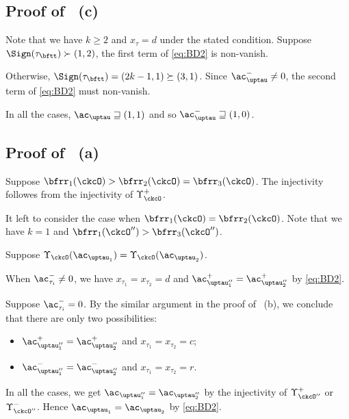\documentclass[12pt,a4paper]{amsart}
\def\pac#1{\ac_{#1}^+}
\def\nac#1{\ac_{#1}^-}
\numberwithin{equation}{section}
\theoremstyle{remark}
\def\PBPes{\mathrm{PBP}^{\mathrm{ext}}_{\star}}
\begin{document}
  \subsection*{\bf Proof of ~(c)}

  Note that we have $k\geq 2$ and $x_{\tau}=d$ under the stated condition.
  Suppose $\Sign( {\tau}_{\bftt} )\succ (1,2)$, the
  first term of \eqref{eq:BD2} is non-vanish.

  Otherwise, $\Sign( \tau_{\bftt} ) = (2k-1,1)\succeq (3,1)$.
  Since $\nac{\uptau}\neq 0$, the second term of \eqref{eq:BD2} must
  non-vanish.

 In all the cases,  $\ac_{\uptau}\sqsupseteq (1,1)$ and so  $\nac{\uptau}\sqsupseteq (1,0)$.


\subsection*{\bf Proof of ~(a)}

Suppose $\bfrr_{1}(\ckcO)>\bfrr_{2}(\ckcO)=\bfrr_{3}(\ckcO)$. The injectivity
followes from the injectivity of $\Upsilon_{\ckcO}^{+}$.

It left to consider the case when $\bfrr_{1}(\ckcO)=\bfrr_{2}(\ckcO)$.
Note that we have $k=1$ and $\bfrr_{1}(\ckcO'')>\bfrr_{3}(\ckcO'')$.

Suppose $\Upsilon_{\ckcO}(\ac_{\uptau_{1}}) = \Upsilon_{\ckcO}(\ac_{\uptau_{2}})$.

When $\nac{ \tau_{i} }\neq 0$, we have $x_{\tau_{1}}=x_{\tau_{2}}=d$ and
$\pac{\uptau''_{1}} = \pac{\uptau''_{2}}$ by \eqref{eq:BD2}.

Suppose $\nac{ \tau_{i} }=0$.
By the similar argument in the proof of ~(b),
we conclude that there are only two possibilities:
\begin{itemize}
  \item $\pac{\uptau''_{1}} = \pac{\uptau''_{2}}$ and
  $x_{\tau_{1}}=x_{\tau_{2}} = c$;
  \item $\nac{\uptau''_{1}} = \nac{\uptau''_{2}}$ and
  $x_{\tau_{1}}=x_{\tau_{2}} = r$.
\end{itemize}

In all the cases,  we get $\ac_{\uptau''_{1}}=\ac_{\uptau''_{2}}$ by the
injectivity of $\Upsilon_{\ckcO''}^{+}$ or $\Upsilon_{\ckcO''}^{-}$.
Hence $\ac_{\uptau_{1}}=\ac_{\uptau_{2}}$ by \eqref{eq:BD2}.
\end{document}
